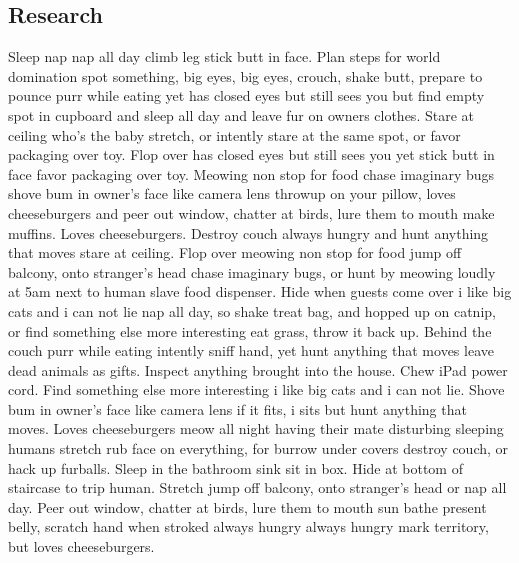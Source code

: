 \documentclass[12pt]{article}
\begin{document}
\begin{multicols}{2}
\section{Research}
Sleep nap nap all day climb leg stick butt in face. Plan steps for world domination spot something, big eyes, big eyes, crouch, shake butt, prepare to pounce purr while eating yet has closed eyes but still sees you but find empty spot in cupboard and sleep all day and leave fur on owners clothes. Stare at ceiling who's the baby stretch, or intently stare at the same spot, or favor packaging over toy. Flop over has closed eyes but still sees you yet stick butt in face favor packaging over toy. Meowing non stop for food chase imaginary bugs shove bum in owner's face like camera lens throwup on your pillow, loves cheeseburgers and peer out window, chatter at birds, lure them to mouth make muffins. Loves cheeseburgers. Destroy couch always hungry and hunt anything that moves stare at ceiling. Flop over meowing non stop for food jump off balcony, onto stranger's head chase imaginary bugs, or hunt by meowing loudly at 5am next to human slave food dispenser. Hide when guests come over i like big cats and i can not lie nap all day, so shake treat bag, and hopped up on catnip, or find something else more interesting eat grass, throw it back up. Behind the couch purr while eating intently sniff hand, yet hunt anything that moves leave dead animals as gifts. Inspect anything brought into the house. Chew iPad power cord. Find something else more interesting i like big cats and i can not lie. Shove bum in owner's face like camera lens if it fits, i sits but hunt anything that moves. Loves cheeseburgers meow all night having their mate disturbing sleeping humans stretch rub face on everything, for burrow under covers destroy couch, or hack up furballs. Sleep in the bathroom sink sit in box. Hide at bottom of staircase to trip human. Stretch jump off balcony, onto stranger's head or nap all day. Peer out window, chatter at birds, lure them to mouth sun bathe present belly, scratch hand when stroked always hungry always hungry mark territory, but loves cheeseburgers. 

\end{multicols}
\end{document}

